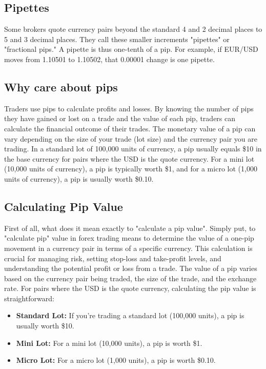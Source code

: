 \documentclass{report}
\begin{document}
     \subsection{Pipettes}
     \bigbreak \noindent 
     Some brokers quote currency pairs beyond the standard 4 and 2 decimal places to 5 and 3 decimal places. They call these smaller increments "pipettes" or "fractional pips." A pipette is thus one-tenth of a pip. For example, if EUR/USD moves from 1.10501 to 1.10502, that 0.00001 change is one pipette.
     \bigbreak \noindent 
     \subsection{Why care about pips}
     \bigbreak \noindent 
     Traders use pips to calculate profits and losses. By knowing the number of pips they have gained or lost on a trade and the value of each pip, traders can calculate the financial outcome of their trades.
     \bigbreak \noindent 
     The monetary value of a pip can vary depending on the size of your trade (lot size) and the currency pair you are trading. In a standard lot of 100,000 units of currency, a pip usually equals \$10 in the base currency for pairs where the USD is the quote currency. For a mini lot (10,000 units of currency), a pip is typically worth \$1, and for a micro lot (1,000 units of currency), a pip is usually worth \$0.10.
     \bigbreak \noindent 
     \subsection{Calculating Pip Value}
     \bigbreak \noindent 
     First of all, what does it mean exactly to "calculate a pip value". Simply put, to "calculate pip" value in forex trading means to determine the value of a one-pip movement in a currency pair in terms of a specific currency. This calculation is crucial for managing risk, setting stop-loss and take-profit levels, and understanding the potential profit or loss from a trade.
     \bigbreak \noindent 
     The value of a pip varies based on the currency pair being traded, the size of the trade, and the exchange rate. For pairs where the USD is the quote currency, calculating the pip value is straightforward:
     \begin{itemize}
         \item \textbf{Standard Lot:} If you're trading a standard lot (100,000 units), a pip is usually worth \$10.
         \item \textbf{Mini Lot:} For a mini lot (10,000 units), a pip is worth \$1.
         \item \textbf{Micro Lot:} For a micro lot (1,000 units), a pip is worth \$0.10.
     \end{itemize}
\end{document}
